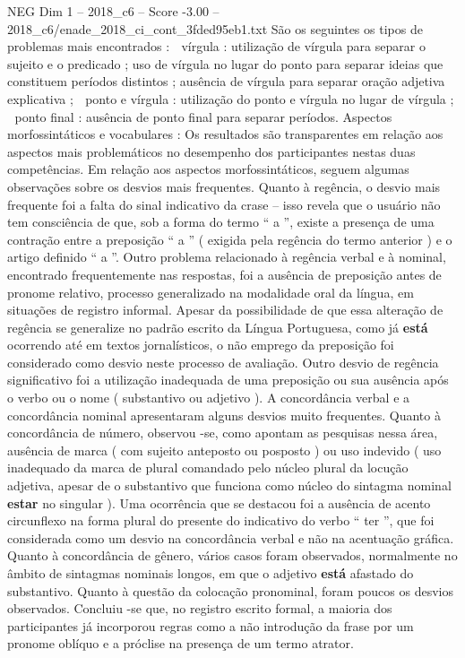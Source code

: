 \begin{textsample}{NEG Dim 1 – 2018\_c6 – Score -3.00 – 2018\_c6/enade\_2018\_ci\_cont\_3fded95eb1.txt}
São os seguintes os tipos de problemas mais encontrados :  vírgula : utilização de vírgula para separar o sujeito e o predicado ; uso de vírgula no lugar do ponto para separar ideias que constituem períodos distintos ; ausência de vírgula para separar oração adjetiva explicativa ;  ponto e vírgula : utilização do ponto e vírgula no lugar de vírgula ;  ponto final : ausência de ponto final para separar períodos.
Aspectos morfossintáticos e vocabulares : Os resultados são transparentes em relação aos aspectos mais problemáticos no desempenho dos participantes nestas duas competências.
Em relação aos aspectos morfossintáticos, seguem algumas observações sobre os desvios mais frequentes.
Quanto à regência, o desvio mais frequente foi a falta do sinal indicativo da crase – isso revela que o usuário não tem consciência de que, sob a forma do termo “ a ”, existe a presença de uma contração entre a preposição “ a ” ( exigida pela regência do termo anterior ) e o artigo definido “ a ”.
Outro problema relacionado à regência verbal e à nominal, encontrado frequentemente nas respostas, foi a ausência de preposição antes de pronome relativo, processo generalizado na modalidade oral da língua, em situações de registro informal.
Apesar da possibilidade de que essa alteração de regência se generalize no padrão escrito da Língua Portuguesa, como já \textbf{está} ocorrendo até em textos jornalísticos, o não emprego da preposição foi considerado como desvio neste processo de avaliação.
Outro desvio de regência significativo foi a utilização inadequada de uma preposição ou sua ausência após o verbo ou o nome ( substantivo ou adjetivo ).
A concordância verbal e a concordância nominal apresentaram alguns desvios muito frequentes.
Quanto à concordância de número, observou -se, como apontam as pesquisas nessa área, ausência de marca ( com sujeito anteposto ou posposto ) ou uso indevido ( uso inadequado da marca de plural comandado pelo núcleo plural da locução adjetiva, apesar de o substantivo que funciona como núcleo do sintagma nominal \textbf{estar} no singular ).
Uma ocorrência que se destacou foi a ausência de acento circunflexo na forma plural do presente do indicativo do verbo “ ter ”, que foi considerada como um desvio na concordância verbal e não na acentuação gráfica.
Quanto à concordância de gênero, vários casos foram observados, normalmente no âmbito de sintagmas nominais longos, em que o adjetivo \textbf{está} afastado do substantivo.
Quanto à questão da colocação pronominal, foram poucos os desvios observados.
Concluiu -se que, no registro escrito formal, a maioria dos participantes já incorporou regras como a não introdução da frase por um pronome oblíquo e a próclise na presença de um termo atrator.

\end{textsample}
